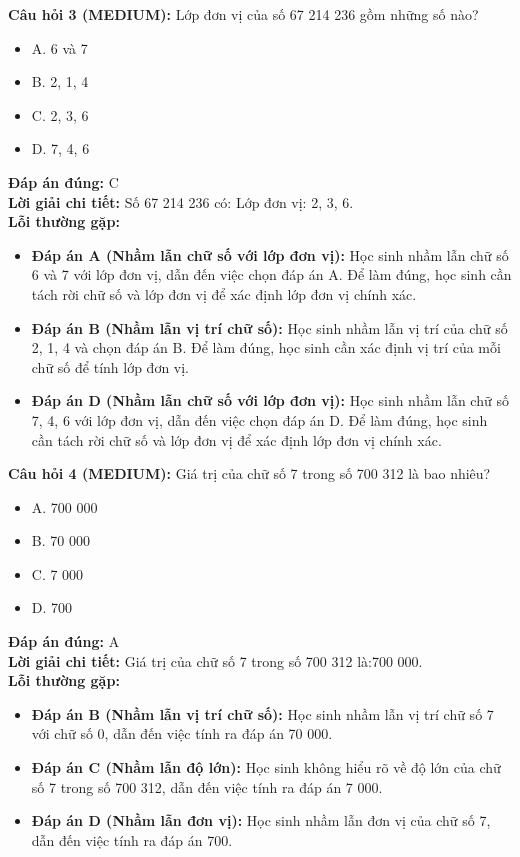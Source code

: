 \documentclass{article}
\begin{document}
\begin{minipage}{\textwidth}
\noindent\textbf{Câu hỏi 3 (MEDIUM):} Lớp đơn vị của số 67 214 236 gồm những số nào? 
\begin{itemize}[label={}]
    \item A. 6 và 7
    \item B. 2, 1, 4
    \item C. 2, 3, 6
    \item D. 7, 4, 6
\end{itemize}
\textbf{Đáp án đúng:} C \\
\textbf{Lời giải chi tiết:} Số 67 214 236 có: Lớp đơn vị: 2, 3, 6. \\
\textbf{Lỗi thường gặp:}
\begin{itemize}
  \item \textbf{Đáp án A (Nhầm lẫn chữ số với lớp đơn vị):} Học sinh nhầm lẫn chữ số 6 và 7 với lớp đơn vị, dẫn đến việc chọn đáp án A. Để làm đúng, học sinh cần tách rời chữ số và lớp đơn vị để xác định lớp đơn vị chính xác.
  \item \textbf{Đáp án B (Nhầm lẫn vị trí chữ số):} Học sinh nhầm lẫn vị trí của chữ số 2, 1, 4 và chọn đáp án B. Để làm đúng, học sinh cần xác định vị trí của mỗi chữ số để tính lớp đơn vị.
  \item \textbf{Đáp án D (Nhầm lẫn chữ số với lớp đơn vị):} Học sinh nhầm lẫn chữ số 7, 4, 6 với lớp đơn vị, dẫn đến việc chọn đáp án D. Để làm đúng, học sinh cần tách rời chữ số và lớp đơn vị để xác định lớp đơn vị chính xác.
\end{itemize}
\end{minipage}
\vspace{1em}

\begin{minipage}{\textwidth}
\noindent\textbf{Câu hỏi 4 (MEDIUM):} Giá trị của chữ số 7 trong số 700 312 là bao nhiêu? 
\begin{itemize}[label={}]
    \item A. 700 000
    \item B. 70 000
    \item C. 7 000
    \item D. 700
\end{itemize}
\textbf{Đáp án đúng:} A \\
\textbf{Lời giải chi tiết:} Giá trị của chữ số 7 trong số 700 312 là:700 000. \\
\textbf{Lỗi thường gặp:}
\begin{itemize}
  \item \textbf{Đáp án B (Nhầm lẫn vị trí chữ số):} Học sinh nhầm lẫn vị trí chữ số 7 với chữ số 0, dẫn đến việc tính ra đáp án 70 000.
  \item \textbf{Đáp án C (Nhầm lẫn độ lớn):} Học sinh không hiểu rõ về độ lớn của chữ số 7 trong số 700 312, dẫn đến việc tính ra đáp án 7 000.
  \item \textbf{Đáp án D (Nhầm lẫn đơn vị):} Học sinh nhầm lẫn đơn vị của chữ số 7, dẫn đến việc tính ra đáp án 700.
\end{itemize}
\end{minipage}
\vspace{1em}
\end{document}
